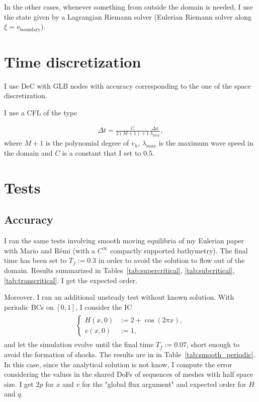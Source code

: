 \documentclass[english]{article}
\theoremstyle{thmstyleone}
\theoremstyle{thmstyletwo}
\theoremstyle{thmstylethree}
\begin{document}
In the other cases, whenever something from outside the domain is needed, I use the state given by a Lagrangian Riemann solver (Eulerian Riemann solver along $\xi=v_{\text{boundary}}$).



\section{Time discretization}
I use DeC with GLB nodes with accuracy corresponding to the one of the space discretization.

I use a CFL of the type

\begin{align}
	\Delta t=\frac{C}{2(M+1)+1}\frac{\Delta x}{\lambda_{max}},
\end{align}
where $M+1$ is the polynomial degree of $v_h$, $\lambda_{max}$ is the maximum wave speed in the domain and $C$ is a constant that I set to $0.5$.




\section{Tests}


\subsection{Accuracy}

I ran the same tests involving smooth moving equilibria of my Eulerian paper~\cite{micalizzi2023novel} with Mario and Rémi (with a $C^\infty$ compactly supported bathymetry).
The final time has been set to $T_f:=0.3$ in order to avoid the solution to flow out of the domain.
%
Results summarized in Tables~\ref{tab:supercritical}, \ref{tab:subcritical}, \ref{tab:transcritical}. I get the expected order.

Moreover, I ran an additional unsteady test without known solution. With periodic BCs on $[0,1]$, I consider the IC
\begin{align}
	\begin{split}
		\begin{cases}
			H(x,0)&:=2+\cos{(2 \pi x)},\\
			v(x,0)&:=1,
		\end{cases}
	\end{split}
\end{align}
and let the simulation evolve until the final time $T_f:=0.07$, short enough to avoid the formation of shocks.
%
The results are in in Table~\ref{tab:smooth_periodic}.
%
In this case, since the analytical solution is not know, I compute the error considering the values in the shared DoFs of sequences of meshes with half space size.
%
I get $2p$ for $x$ and $v$ for the "global flux argument" and expected order for $H$ and $q$.
\end{document}
